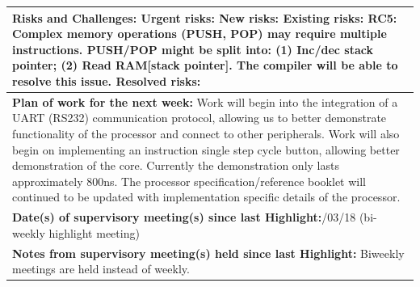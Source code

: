 \documentclass[11pt,a4paper]{article}
\begin{document}
\begin{table}[H]
\begin{tabularx}{\textwidth}{|X|}
	\\ \hline
	\textbf{Risks and Challenges:}\newline
	{\color{red} Urgent risks:}\newline
	{\color{orange} New risks:}\newline
	{\color{purple} Existing risks:\newline
	RC5: Complex memory operations (PUSH, POP) may require multiple instructions. PUSH/POP might be split into: (1) Inc/dec stack pointer; (2) Read RAM[stack pointer]. The compiler will be able to resolve this issue.}\newline
	{\color{gray} Resolved risks:}
	\\ \hline
	\textbf{Plan of work for the next week:}\newline
	Work will begin into the integration of a UART (RS232) communication protocol, allowing us to better demonstrate functionality of the processor and connect to other peripherals.
	\newline
	Work will also begin on implementing an instruction single step cycle button, allowing better demonstration of the core. Currently the demonstration only lasts approximately 800ns. 
	\newline
	The processor specification/reference booklet will continued to be updated with implementation specific details of the processor.
	\\ \hline
	\textbf{Date(s) of supervisory meeting(s) since last Highlight:}\newline
	01/03/18 (bi-weekly highlight meeting)
	\\ \hline
	\textbf{Notes from supervisory meeting(s) held since last Highlight:}\newline
	Biweekly meetings are held instead of weekly.
	\\ \hline
    \end{tabularx}
\end{table}


\newpage
\end{document}

